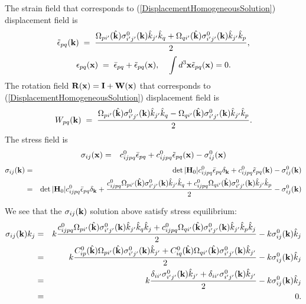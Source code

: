 \documentclass[12pt]{article}
\begin{document}
The strain field that corresponds to
(\ref{DisplacementHomogeneousSolution}) displacement field is
\begin{equation}
 \tilde{\epsilon}_{pq}({\bf k}) \;=\; 
\frac{\Omega_{pi'}(\hat{\bf k})\sigma^0_{i'j'}({\bf k}) \hat{k}_{j'}\hat{k}_q + 
      \Omega_{qi'}(\hat{\bf k})\sigma^0_{i'j'}({\bf k}) \hat{k}_{j'}\hat{k}_p}
 {2},
 \label{StrainHomogeneousSolution}
\end{equation}
\begin{equation}
 {\epsilon}_{pq}({\bf x}) \;=\; \bar{\epsilon}_{pq} + 
 \tilde{\epsilon}_{pq}({\bf x}), \;\;\;\;
 \int d^3{\bf x} \tilde{\epsilon}_{pq}({\bf x}) = 0.
\end{equation}
The rotation field ${\bf R}({\bf x})={\bf I}+{\bf W}({\bf x})$ 
that corresponds to
(\ref{DisplacementHomogeneousSolution}) displacement field is
\begin{equation}
 W_{pq}({\bf k}) \;=\; 
\frac{\Omega_{pi'}(\hat{\bf k})\sigma^0_{i'j'}({\bf k})\hat{k}_{j'}\hat{k}_q - 
      \Omega_{qi'}(\hat{\bf k})\sigma^0_{i'j'}({\bf k}) \hat{k}_{j'} \hat{k}_p}
 {2}.
\end{equation}
The stress field is
\begin{eqnarray}
 \sigma_{ij}({\bf x}) =&& c_{ijpq}^0\bar{\epsilon}_{pq} 
+ c_{ijpq}^0\tilde{\epsilon}_{pq}({\bf x}) - \sigma^0_{ij}({\bf x})
 \label{StressHomogeneousSolutionRealSpace}
\end{eqnarray}
\begin{eqnarray}
 \sigma_{ij}({\bf k}) =&& \det|{\bf H}_0|c_{ijpq}^0\bar{\epsilon}_{pq} 
\delta_{\bf k}+
c_{ijpq}^0\tilde{\epsilon}_{pq}({\bf k}) 
- \sigma^0_{ij}({\bf k}) \label{StressHomogeneousSolutionkSpace}\\
=&& \det|{\bf H}_0|c_{ijpq}^0\bar{\epsilon}_{pq} 
\delta_{\bf k}+
\frac{c_{ijpq}^0\Omega_{pi'}(\hat{\bf k})\sigma^0_{i'j'}({\bf k}) 
\hat{k}_{j'} \hat{k}_q + 
      c_{ijpq}^0\Omega_{qi'}(\hat{\bf k})\sigma^0_{i'j'}({\bf k}) 
\hat{k}_{j'} \hat{k}_p}
 {2}
- \sigma^0_{ij}({\bf k}) \nonumber  
\end{eqnarray}

We see that the $\sigma_{ij}({\bf k})$ solution above satisfy stress
equilibrium:
\begin{eqnarray}
 \sigma_{ij}({\bf k}) k_j 
=&& 
k\frac{c_{ijpq}^0\Omega_{pi'}(\hat{\bf k})\sigma^0_{i'j'}({\bf k}) 
\hat{k}_{j'} \hat{k}_q \hat{k}_j + 
      c_{ijpq}^0\Omega_{qi'}(\hat{\bf k})\sigma^0_{i'j'}({\bf k}) 
\hat{k}_{j'} \hat{k}_p \hat{k}_j}
 {2}
- k\sigma^0_{ij}({\bf k})\hat{k}_j \nonumber\\
=&& 
k\frac{C_{ip}^0(\hat{\bf k})\Omega_{pi'}(\hat{\bf k})\sigma^0_{i'j'}({\bf k}) 
\hat{k}_{j'} + 
      C_{iq}^0(\hat{\bf k})\Omega_{qi'}(\hat{\bf k})\sigma^0_{i'j'}({\bf k}) 
\hat{k}_{j'} }
 {2}
- k\sigma^0_{ij}({\bf k})\hat{k}_j\nonumber\\
=&& 
k\frac{\delta_{ii'}\sigma^0_{i'j'}({\bf k}) 
\hat{k}_{j'} + 
      \delta_{ii'}\sigma^0_{i'j'}({\bf k}) 
\hat{k}_{j'} }
 {2}
- k\sigma^0_{ij}({\bf k})\hat{k}_j\nonumber\\
=&& 0.
\end{eqnarray}
\end{document}
